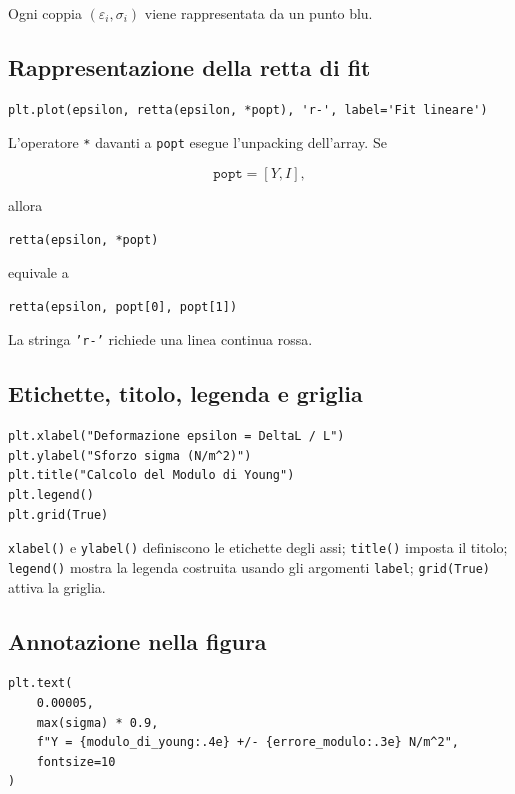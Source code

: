 \documentclass[11pt,a4paper]{book}
\begin{document}
Ogni coppia $(\varepsilon_i,\sigma_i)$ viene rappresentata da un punto blu.

\subsection{Rappresentazione della retta di fit}

\begin{lstlisting}
plt.plot(epsilon, retta(epsilon, *popt), 'r-', label='Fit lineare')
\end{lstlisting}

L'operatore \texttt{*} davanti a \texttt{popt} esegue l'unpacking dell'array. Se

\begin{equation}
    \texttt{popt}=[Y,I],
\end{equation}

allora

\begin{lstlisting}
retta(epsilon, *popt)
\end{lstlisting}

equivale a

\begin{lstlisting}
retta(epsilon, popt[0], popt[1])
\end{lstlisting}

La stringa \texttt{'r-'} richiede una linea continua rossa.

\subsection{Etichette, titolo, legenda e griglia}

\begin{lstlisting}
plt.xlabel("Deformazione epsilon = DeltaL / L")
plt.ylabel("Sforzo sigma (N/m^2)")
plt.title("Calcolo del Modulo di Young")
plt.legend()
plt.grid(True)
\end{lstlisting}

\texttt{xlabel()} e \texttt{ylabel()} definiscono le etichette degli assi; \texttt{title()} imposta il titolo; \texttt{legend()} mostra la legenda costruita usando gli argomenti \texttt{label}; \texttt{grid(True)} attiva la griglia.

\subsection{Annotazione nella figura}

\begin{lstlisting}
plt.text(
    0.00005,
    max(sigma) * 0.9,
    f"Y = {modulo_di_young:.4e} +/- {errore_modulo:.3e} N/m^2",
    fontsize=10
)
\end{lstlisting}
\end{document}

